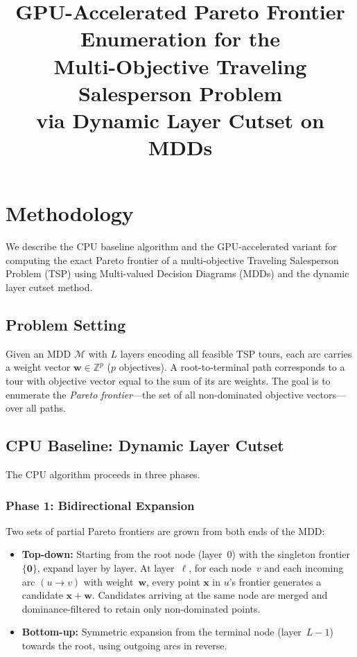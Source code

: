\documentclass[11pt]{article}
\title{GPU-Accelerated Pareto Frontier Enumeration for the\\
       Multi-Objective Traveling Salesperson Problem\\
       via Dynamic Layer Cutset on MDDs}
\author{}
\date{}
\begin{document}
\maketitle

\section{Methodology}

We describe the CPU baseline algorithm and the GPU-accelerated variant
for computing the exact Pareto frontier of a multi-objective Traveling
Salesperson Problem (TSP) using Multi-valued Decision Diagrams (MDDs)
and the dynamic layer cutset method.

\subsection{Problem Setting}

Given an MDD $\mathcal{M}$ with $L$ layers encoding all feasible TSP
tours, each arc carries a weight vector
$\mathbf{w} \in \mathbb{Z}^p$ ($p$ objectives).
A root-to-terminal path corresponds to a tour with objective vector
equal to the sum of its arc weights.
The goal is to enumerate the \emph{Pareto frontier}---the set of all
non-dominated objective vectors---over all paths.

\subsection{CPU Baseline: Dynamic Layer Cutset}

The CPU algorithm proceeds in three phases.

\subsubsection{Phase 1: Bidirectional Expansion}

Two sets of partial Pareto frontiers are grown from both ends of the MDD:

\begin{itemize}
  \item \textbf{Top-down:} Starting from the root node (layer~0) with
        the singleton frontier $\{\mathbf{0}\}$, expand layer by layer.
        At layer~$\ell$, for each node~$v$ and each incoming arc
        $(u \to v)$ with weight~$\mathbf{w}$, every point $\mathbf{x}$
        in $u$'s frontier generates a candidate $\mathbf{x} + \mathbf{w}$.
        Candidates arriving at the same node are merged and
        dominance-filtered to retain only non-dominated points.

  \item \textbf{Bottom-up:} Symmetric expansion from the terminal node
        (layer~$L{-}1$) towards the root, using outgoing arcs in reverse.
\end{itemize}
\end{document}
